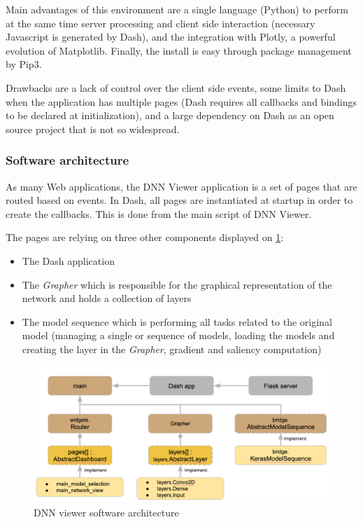 Main advantages of this environment are a single language (Python) to perform at the same time server processing and client side interaction (necessary Javascript is generated by Dash), and the integration with Plotly, a powerful evolution of Matplotlib. Finally, the install is easy through package management by Pip3.

Drawbacks are a lack of control over the client side events, some limits to Dash when the application has multiple pages (Dash requires all callbacks and bindings to be declared at initialization), and a large dependency on Dash as an open source project that is not so widespread.


\subsubsection{Software architecture}

As many Web applications, the DNN Viewer application is a set of pages that are routed based on events. In Dash, all pages are instantiated at startup in order to create the callbacks. This is done from the main script of DNN Viewer.

The pages are relying on three other components displayed on \ref{fig:dnn-viewer-archi2}:
\begin{itemize}
    \item The Dash application
    \item The \textit{Grapher} which is responsible for the graphical representation of the network and holds a collection of layers
    \item The model sequence which is performing all tasks related to the original model (managing a single or sequence of models, loading the models and creating the layer in the \textit{Grapher}, gradient and saliency computation)
\end{itemize}

\begin{figure}[H]
    \centering
    \includegraphics[scale=0.3]{images/dnn-viewer/Architecture2.png}
    \caption{DNN viewer software architecture}
    \label{fig:dnn-viewer-archi2}
\end{figure}


